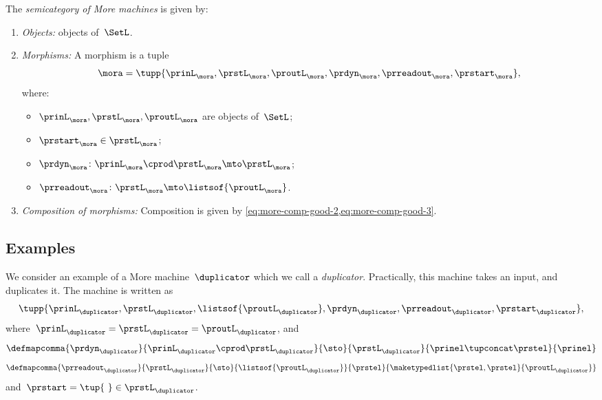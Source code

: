 \begin{definition}[\More]
    \label{def:More}
    The \emph{semicategory of More machines} \More is given by:
    \begin{enumerate}
        \item \emph{Objects:} objects of~$\SetL$.
        \item \emph{Morphisms:}
              A morphism is a tuple
              \begin{equation}
                  \mora = \tupp{\prinL_{\mora},\prstL_{\mora}, \proutL_{\mora},\prdyn_{\mora},\prreadout_{\mora},\prstart_{\mora}},
              \end{equation}
              where:
              \begin{itemize}
                  \item $\prinL_{\mora},\prstL_{\mora}, \proutL_{\mora}$ are objects of~$\SetL$;
                  \item $\prstart_{\mora} \in \prstL_{\mora}$;
                  \item $ \prdyn_{\mora} \colon \prinL_{\mora} \cprod \prstL_{\mora} \mto \prstL_{\mora}$;
                  \item $ \prreadout_{\mora} \colon \prstL_{\mora}  \mto \listsof{\proutL_{\mora}}$.
              \end{itemize}
        \item \emph{Composition of morphisms:}
              Composition is given by \cref{eq:more-comp-good-2,eq:more-comp-good-3}.
    \end{enumerate}
\end{definition}

\subsection{Examples}

\begin{example}[Duplicator]
    We consider an example of a More machine~$\duplicator$ which we call a \emph{duplicator}.
    Practically, this machine takes an input, and duplicates it.
    The machine is written as
    \begin{equation}
        \tupp{\prinL_{\duplicator},\prstL_{\duplicator},\listsof{\proutL_{\duplicator}},\prdyn_{\duplicator},\prreadout_{\duplicator},\prstart_{\duplicator}},
    \end{equation}
    where~$\prinL_{\duplicator}=\prstL_{\duplicator}=\proutL_\duplicator$, and
    \begin{equation}
        \defmapcomma{\prdyn_\duplicator}
        { \prinL_\duplicator \cprod \prstL_\duplicator}
        {\sto}
        {\prstL_\duplicator}
        {\prinel \tupconcat \prstel}
        {\prinel}
    \end{equation}
    \begin{equation}
        \defmapcomma{\prreadout_\duplicator}
        {\prstL_\duplicator}
        {\sto}
        {\listsof{\proutL_\duplicator}}
        {\prstel}
        {\maketypedlist{\prstel,\prstel}{\proutL_\duplicator}}
    \end{equation}
    and~$\prstart=\tup{ \ } \in \prstL_\duplicator$.
\end{example}

